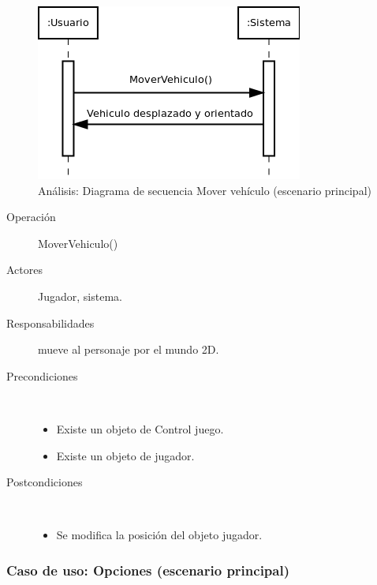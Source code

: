 \begin{figure}[H] 
  \label{secuencia_mover_vehiculo}
  \begin{center}
    \includegraphics[scale=0.7]{imagenes/analisis/secuencia_mover_vehiculo.png}
  \end{center}
  \caption{Análisis: Diagrama de secuencia Mover vehículo (escenario principal)}
\end{figure}

\begin{description}
    \item [Operación] MoverVehiculo()
    \item [Actores] Jugador, sistema.
    \item [Responsabilidades] mueve al personaje por el mundo 2D.
    \item [Precondiciones] $\quad$
        \begin{itemize}
            \item Existe un objeto de Control juego.
            \item Existe un objeto de jugador.        
        \end{itemize}
    \item [Postcondiciones] $\quad$
        \begin{itemize}
            \item Se modifica la posición del objeto jugador.
        \end{itemize}
\end{description}

\subsubsection{Caso de uso: Opciones (escenario principal)}

